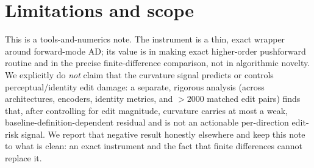 \documentclass[11pt]{article}
\begin{document}
\section{Limitations and scope}
This is a tools-and-numerics note. The instrument is a thin, exact wrapper around
forward-mode AD; its value is in making exact higher-order pushforward routine
and in the precise finite-difference comparison, not in algorithmic novelty. We
explicitly do \emph{not} claim that the curvature signal predicts or controls
perceptual/identity edit damage: a separate, rigorous analysis (across
architectures, encoders, identity metrics, and $>$$2000$ matched edit pairs)
finds that, after controlling for edit magnitude, curvature carries at most a
weak, baseline-definition-dependent residual and is not an actionable
per-direction edit-risk signal. We report that negative result honestly
elsewhere and keep this note to what is clean: an exact instrument and the fact
that finite differences cannot replace it.
\end{document}
